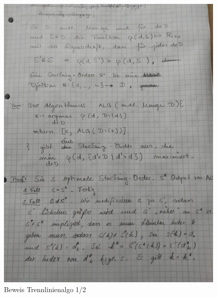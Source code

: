 \documentclass[a4paper,11pt]{article}
\theoremstyle{mytheor}
\begin{document}
\begin{figure}[htp]
  \includegraphics[width=\textwidth,height=\textheight,keepaspectratio]{assets/david_proof1.jpg}
  \caption{Beweis Trennlinienalgo 1/2}
\end{figure}
\end{document}
